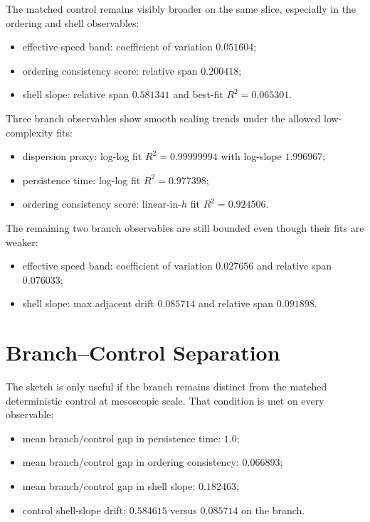 \documentclass[11pt]{article}
\begin{document}
The matched control remains visibly broader on the same slice, especially in the ordering and shell observables:
\begin{itemize}
\item effective speed band: coefficient of variation $0.051604$;
\item ordering consistency score: relative span $0.200418$;
\item shell slope: relative span $0.581341$ and best-fit $R^2 = 0.065301$.
\end{itemize}

Three branch observables show smooth scaling trends under the allowed low-complexity fits:
\begin{itemize}
\item dispersion proxy: log-log fit $R^2 = 0.99999994$ with log-slope $1.996967$;
\item persistence time: log-log fit $R^2 = 0.977398$;
\item ordering consistency score: linear-in-$h$ fit $R^2 = 0.924506$.
\end{itemize}

The remaining two branch observables are still bounded even though their fits are weaker:
\begin{itemize}
\item effective speed band: coefficient of variation $0.027656$ and relative span $0.076033$;
\item shell slope: max adjacent drift $0.085714$ and relative span $0.091898$.
\end{itemize}

\section{Branch--Control Separation}

The sketch is only useful if the branch remains distinct from the matched deterministic control at mesoscopic scale. That condition is met on every observable:
\begin{itemize}
\item mean branch/control gap in persistence time: $1.0$;
\item mean branch/control gap in ordering consistency: $0.066893$;
\item mean branch/control gap in shell slope: $0.182463$;
\item control shell-slope drift: $0.584615$ versus $0.085714$ on the branch.
\end{itemize}
\end{document}
